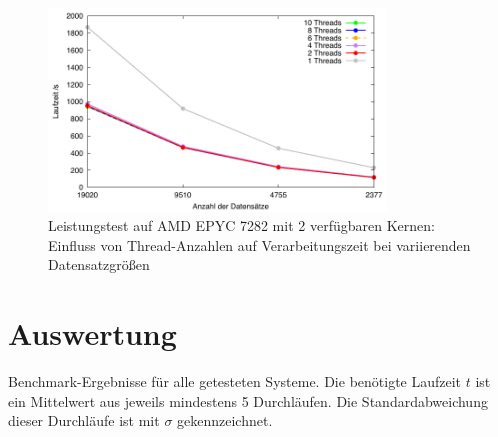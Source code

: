 \begin{figure}[H]
\centering
\includegraphics[width=0.8\textwidth]{../results/plots/vps/comp_all_threads.pdf}
\caption{Leistungstest auf AMD EPYC 7282 mit 2 verfügbaren Kernen: Einfluss von Thread-Anzahlen auf Verarbeitungszeit bei variierenden Datensatzgrößen}
\label{fig:vps_benchmark_threads}
\end{figure}

\section{Auswertung}

\begin{table}[H]
\centering
\caption{Benchmark-Ergebnisse für alle getesteten Systeme. Die benötigte Laufzeit $t$ ist ein Mittelwert aus jeweils mindestens 5 Durchläufen. Die Standardabweichung dieser Durchläufe ist mit $\sigma$ gekennzeichnet.}
\label{tab:performance_comparison}
\begin{adjustbox}{max width=\textwidth}
\renewcommand{\arraystretch}{1.5}

\end{adjustbox}
\end{table}
